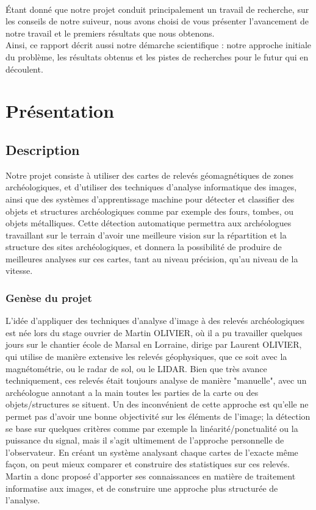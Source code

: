 \documentclass[a4paper, 12pt, titlepage, oneside, french]{article}
\begin{document}
	\paragraph{}

	Étant donné que notre projet conduit principalement un travail de recherche, sur les conseils de notre suiveur, nous avons choisi de vous présenter l'avancement de notre travail et le premiers résultats que nous obtenons. \\
	Ainsi, ce rapport décrit aussi notre démarche scientifique : notre approche initiale du problème, les résultats obtenus et les pistes de recherches pour le futur qui en découlent.

	\newpage
\section{Présentation}
	\subsection{Description}%
		Notre projet consiste à utiliser des cartes de relevés géomagnétiques de zones archéologiques, et d'utiliser des techniques d'analyse informatique des images, ainsi que des systèmes d'apprentissage machine pour détecter et classifier des objets et structures archéologiques comme par exemple des fours, tombes, ou objets métalliques. 
		Cette détection automatique permettra aux archéologues travaillant sur le terrain d'avoir une meilleure vision sur la répartition et la structure des sites archéologiques, et donnera la possibilité de produire de meilleures analyses sur ces cartes, tant au niveau précision, qu'au niveau de la vitesse.
		
		\subsubsection{Genèse du projet}
		L'idée d'appliquer des techniques d'analyse d'image à des relevés archéologiques est née lors du stage ouvrier de Martin OLIVIER, où il a pu travailler quelques jours sur le chantier école de Marsal en Lorraine, dirige par Laurent OLIVIER, qui utilise de manière extensive les relevés géophysiques, que ce soit avec la magnétométrie, ou le radar de sol, ou le LIDAR. Bien que très avance techniquement, ces relevés était toujours analyse de manière "manuelle", avec un archéologue annotant a la main toutes les parties de la carte ou des objets/structures se situent. Un des inconvénient de cette approche est qu'elle ne permet pas d'avoir une bonne objectivité sur les éléments de l'image; la détection se base sur quelques critères comme par exemple la linéarité/ponctualité ou la puissance du signal, mais il s'agit ultimement de l'approche personnelle de l'observateur. En créant un système analysant chaque cartes de l'exacte même façon, on peut mieux comparer et construire des statistiques sur ces relevés. Martin a donc proposé d'apporter ses connaissances en matière de traitement informatise aux images, et de construire une approche plus structurée de l'analyse.
\end{document}

